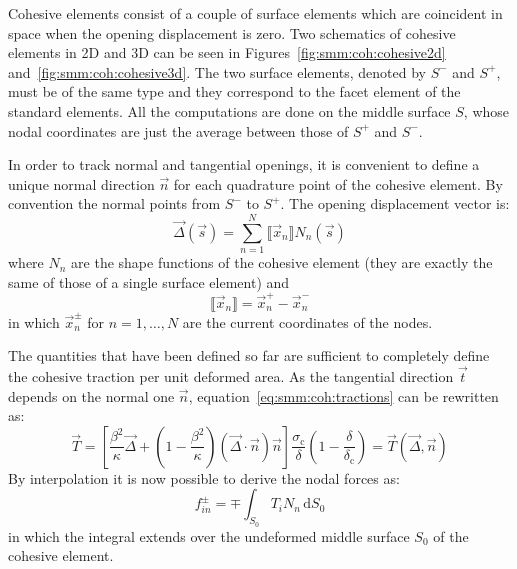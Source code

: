 Cohesive elements consist of a couple of surface elements which are
coincident in space when the opening displacement is zero. Two
schematics of cohesive elements in 2D and 3D can be seen in
Figures~\ref{fig:smm:coh:cohesive2d}
and~\ref{fig:smm:coh:cohesive3d}. The two surface elements, denoted by
$S^-$ and $S^+$, must be of the same type and they correspond to the
facet element of the standard elements. All the computations are done
on the middle surface $S$, whose nodal coordinates are just the
average between those of $S^+$ and $S^-$.

In order to track normal and tangential openings, it is convenient to
define a unique normal direction $\vec{n}$ for each quadrature point
of the cohesive element. By convention the normal points from $S^-$ to
$S^+$. The opening displacement vector is:
\begin{equation}
  \label{eq:opening_displacement}
  \vec{\Delta} (\vec{s}) = \sum_{n=1}^N \llbracket \vec{x}_n \rrbracket N_n (\vec s)
\end{equation}
where $N_n$ are the shape functions of the cohesive element (they are
exactly the same of those of a single surface element) and
\begin{equation}
  \label{eq:disp_difference}
  \llbracket \vec{x}_n \rrbracket = \vec{x}_n^+ - \vec{x}_n^-
\end{equation}
in which $\vec{x}_n^\pm$ for $n=1,\dots,N$ are the current coordinates
of the nodes.

The quantities that have been defined so far are sufficient to
completely define the cohesive traction per unit deformed
area. As the tangential direction $\vec{t}$ depends on the normal one
$\vec{n}$, equation~\eqref{eq:smm:coh:tractions} can be rewritten as:
\begin{equation}
  \vec{T} = \left[ \frac{\beta^2}{\kappa} \vec{\Delta} +
    \left( 1- \frac{\beta^2}{\kappa}\right)
    \left( \vec{\Delta} \cdot \vec{n}\right) \vec{n} \right]
  \frac{\sigma_\mathrm{c}}{\delta}
  \left( 1- \frac{\delta}{\delta_\mathrm{c}} \right) =
  \vec{T}(\vec{\Delta}, \vec{n})
\end{equation}
 By interpolation it is now possible to derive the nodal
forces as:
\begin{equation}
  f_{in}^\pm = \mp \int_{S_0} T_i N_n\, \mathrm{d}S_0
\end{equation}
in which the integral extends over the undeformed middle surface $S_0$
of the cohesive element.

